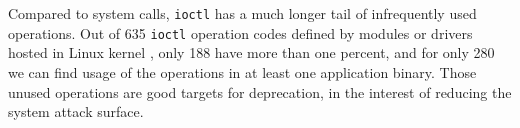 





Compared to system calls, 
{\tt ioctl} has a much longer tail of infrequently used operations.
Out of 635 {\tt ioctl} operation codes defined by modules or drivers hosted in Linux kernel ,
only 188 have \usagemetric{} more than one percent,
and for only 280 we can find usage of the operations in at least one application binary.
Those unused operations are good targets for deprecation, in the interest
of reducing the system attack surface.


